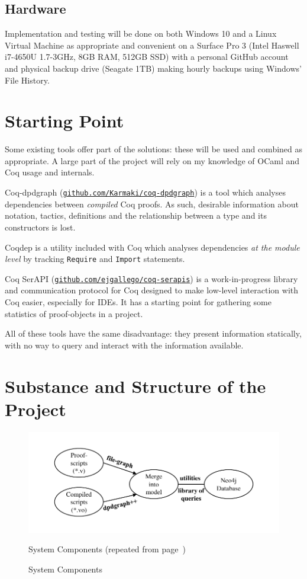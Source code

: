 \documentclass[12pt,a4paper]{article}
\begin{document}
\subsection*{Hardware}
Implementation and testing will be done on both Windows 10 and a Linux Virtual
Machine as appropriate and convenient on a Surface Pro 3 (Intel Haswell i7-4650U
1.7-3GHz, 8GB RAM, 512GB SSD) with a personal GitHub account and physical backup
drive (Seagate 1TB) making hourly backups using Windows' File History.

\section*{Starting Point}
Some existing tools offer part of the solutions: these will be used and
combined as appropriate. A large part of the project will rely on my knowledge of
OCaml and Coq usage and internals.

Coq-dpdgraph
(\href{http://github.com/Karmaki/coq-dpdgraph}{\texttt{github.com/Karmaki/coq-dpdgraph}})
is a tool which analyses dependencies between \emph{compiled} Coq proofs. As
such, desirable information about notation, tactics, definitions and the
relationship between a type and its constructors is lost.

Coqdep is a utility included with Coq which analyses dependencies \emph{at the
module level} by tracking {\tt Require} and {\tt Import} statements.

Coq SerAPI
(\href{http://github.com/ejgallego/coq-serapis}{\texttt{github.com/ejgallego/coq-serapis}})
is a work-in-progress library and communication protocol for Coq designed to
make low-level interaction with Coq easier, especially for IDEs. It has a
starting point for gathering some statistics of proof-objects in a project.

All of these tools have the same disadvantage: they present information statically,
with no way to query and interact with the information available.

\section*{Substance and Structure of the Project}
\begin{figure}[tb]
	\centering
	\includegraphics[width=\textwidth, page=1]{proposal/proposal-project-structure-diagram.pdf} 
  \ifwhole%
    \caption{System Components (repeated from page~\pageref{fig:structure})}
  \else
    \caption{System Components}\label{fig:structure}
  \fi
\end{figure}
\end{document}
